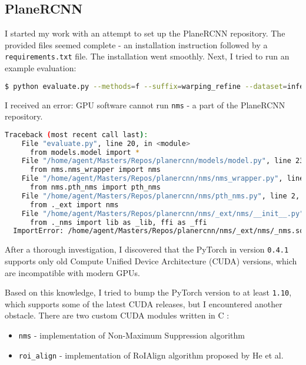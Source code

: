 \subsection{PlaneRCNN} \label{subsec:planercnn}

I started my work with an attempt to set up the PlaneRCNN repository. \cite{planercnn-repository}
The provided files seemed complete - an installation instruction followed by a \texttt{requirements.txt} file.
The installation went smoothly.
Next, I tried to run an example evaluation:
\begin{lstlisting}[language=bash,basicstyle=\small]
    $ python evaluate.py --methods=f --suffix=warping_refine --dataset=inference --customDataFolder=example_images
\end{lstlisting}
I received an error: GPU software cannot run \texttt{nms} - a part of the PlaneRCNN repository.
\begin{lstlisting}[language=bash,basicstyle=\small]
    Traceback (most recent call last):
    File "evaluate.py", line 20, in <module>
      from models.model import *
    File "/home/agent/Masters/Repos/planercnn/models/model.py", line 23, in <module>
      from nms.nms_wrapper import nms
    File "/home/agent/Masters/Repos/planercnn/nms/nms_wrapper.py", line 11, in <module>
      from nms.pth_nms import pth_nms
    File "/home/agent/Masters/Repos/planercnn/nms/pth_nms.py", line 2, in <module>
      from ._ext import nms
    File "/home/agent/Masters/Repos/planercnn/nms/_ext/nms/__init__.py", line 3, in <module>
      from ._nms import lib as _lib, ffi as _ffi
  ImportError: /home/agent/Masters/Repos/planercnn/nms/_ext/nms/_nms.so: undefined symbol: __cudaRegisterFatBinaryEnd
\end{lstlisting}

After a thorough investigation, I discovered that the PyTorch \cite{pytorch} in version \texttt{0.4.1}
supports only old  Compute Unified Device Architecture (CUDA) \cite{cuda-toolkit} versions,
which are incompatible with modern GPUs.

\par

Based on this knowledge, I tried to bump the PyTorch version to at least \texttt{1.10},
which supports some of the latest CUDA releases, but I encountered another obstacle.
There are two custom CUDA modules written in C \cite{c-language}:
\begin{itemize}
\item \texttt{nms} - implementation of Non-Maximum Suppression algorithm
\item \texttt{roi\_align} - implementation of RoIAlign algorithm proposed by He et al. \cite{inproceedingsMaskRCNN}
\end{itemize}

